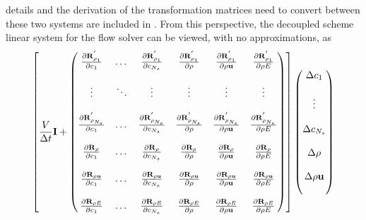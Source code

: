 details and the derivation of the transformation matrices need to convert
between these two systems are included in .  From
this perspective, the decoupled scheme linear system for the flow solver can be
viewed, with no approximations, as
\begin{equation}
  \left[ 
    \frac{V}{\Delta t} \mi + 
    \begin{pmatrix}
      \rpdiff{\rho_1}{c_1}      & \dots  & \rpdiff{\rho_1}{c_{N_s}}     & \rpdiff{\rho_1}{\rho}     & \rpdiff{\rho_1}{\rho \vu}     &  \rpdiff{\rho_1}{\rho E}  \\ \\
      \vdots                    & \ddots & \vdots                       & \vdots                    & \vdots                        & \vdots                    \\ \\
      \rpdiff{\rho_{N_s}}{c_1}  & \dots  & \rpdiff{\rho_{N_s}}{c_{N_s}} & \rpdiff{\rho_{N_s}}{\rho} & \rpdiff{\rho_{N_s}}{\rho \vu} &  \rpdiff{\rho_{N_s}}{\rho E}    \\ \\
      \rdiff{\rho}{c_1}         & \dots  & \rdiff{\rho}{c_{N_s}}        & \rdiff{\rho}{\rho}        & \rdiff{\rho}{\rho \vu}        &  \rdiff{\rho}{\rho E}     \\ \\
      \rdiff{\rho \vu}{c_1}     & \dots  & \rdiff{\rho \vu}{c_{N_s}}    & \rdiff{\rho \vu}{\rho}    & \rdiff{\rho \vu}{\rho \vu}    &  \rdiff{\rho \vu}{\rho E} \\ \\
      \rdiff{\rho E}{c_1}       & \dots  & \rdiff{\rho E}{c_{N_s}}      & \rdiff{\rho E}{\rho}      & \rdiff{\rho E}{\rho \vu}      &  \rdiff{\rho E}{\rho E}
    \end{pmatrix}
  \right]
  \begin{pmatrix}
    \Delta c_1      \\ \\
    \vdots     \\ \\
    \Delta c_{N_s}  \\ \\
    \Delta \rho     \\ \\
    \Delta \rho \vu \\ \\

\end{pmatrix}
\end{equation}
